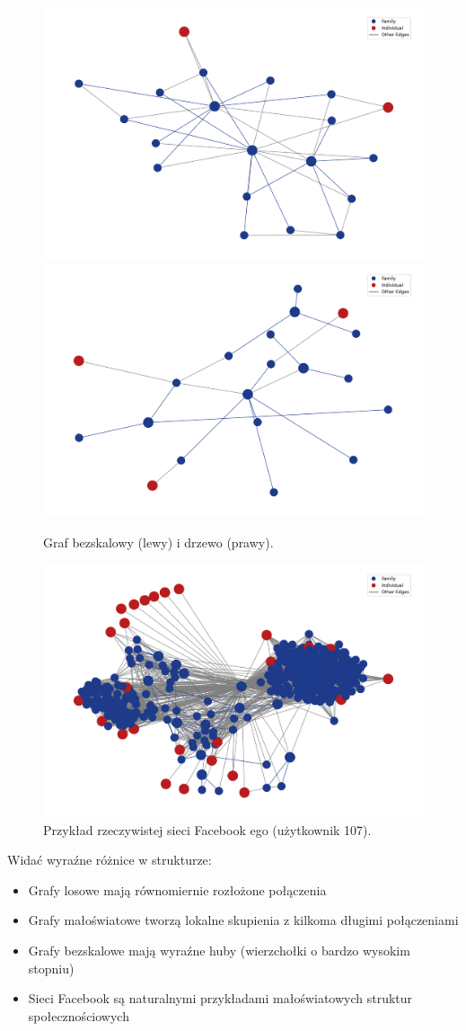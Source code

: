\begin{figure}[H]
  \centering
  \includegraphics[width=0.48\linewidth]{assets/figures/graph_scale_free_20.png}
  \includegraphics[width=0.48\linewidth]{assets/figures/graph_tree_20.png}
  \caption{Graf bezskalowy (lewy) i drzewo (prawy).}
  \label{fig:graphs_scale_tree}
\end{figure}

\begin{figure}[H]
  \centering
  \includegraphics[width=0.6\linewidth]{assets/figures/graph_facebook_ego_107.png}
  \caption{Przykład rzeczywistej sieci Facebook ego (użytkownik 107).}
  \label{fig:graph_facebook}
\end{figure}

Widać wyraźne różnice w strukturze:
\begin{itemize}
  \item Grafy losowe mają równomiernie rozłożone połączenia
  \item Grafy małoświatowe tworzą lokalne skupienia z kilkoma długimi połączeniami
  \item Grafy bezskalowe mają wyraźne huby (wierzchołki o bardzo wysokim stopniu)
  \item Sieci Facebook są naturalnymi przykładami małoświatowych struktur społecznościowych
\end{itemize}


